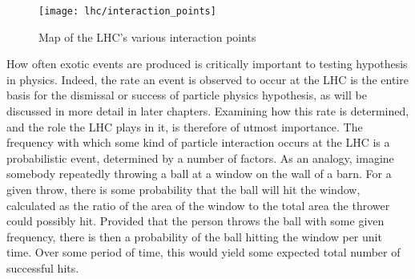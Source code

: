     \begin{figure}[h]
        \texttt{[image: lhc/interaction\_points]}
        \caption{Map of the LHC's various interaction points \cite{lhc_machine}}
        \label{fig:interaction_points}
    \end{figure}

    How often exotic events are produced is critically important to testing hypothesis in physics.
    Indeed, the rate an event is observed to occur at the LHC is the entire basis for the dismissal or success of particle physics hypothesis, as will be discussed in more detail in later chapters.
    Examining how this rate is determined, and the role the LHC plays in it, is therefore of utmost importance.
    The frequency with which some kind of particle interaction occurs at the LHC is a probabilistic event, determined by a number of factors.
    As an analogy, imagine somebody repeatedly throwing a ball at a window on the wall of a barn.
    For a given throw, there is some probability that the ball will hit the window, calculated as the ratio of the area of the window to the total area the thrower could possibly hit.
    Provided that the person throws the ball with some given frequency, there is then a probability of the ball hitting the window per unit time.
    Over some period of time, this would yield some expected total number of successful hits.

